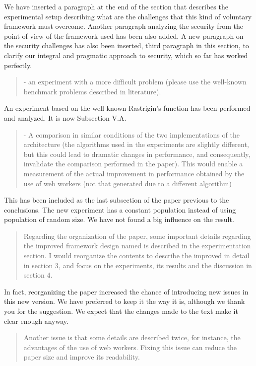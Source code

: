 \documentclass[preprint]{elsarticle}
\begin{document}
We have inserted a paragraph at the end of the section that describes
the experimental setup describing what are the challenges that this
kind of voluntary framework must overcome. Another paragraph analyzing
the security from the point of view of the framework used has been
also added. A new paragraph on the security challenges has also been
inserted, third paragraph in this section, to clarify our integral and
pragmatic approach to security, which so far has worked perfectly. 

\begin{quote}
-  an experiment with a more difficult problem (please use the well-known benchmark problems
described in literature).
\end{quote}

An experiment based on the well known Rastrigin's function has been
performed and analyzed. It is now Subsection V.A.

\begin{quote}
-  A comparison in similar conditions of the two implementations of the architecture (the algorithms
used in the experiments are slightly different, but this could lead to dramatic changes in
performance, and consequently, invalidate the comparison performed in the paper). This would
enable a measurement of the actual improvement in performance obtained by the use of web
workers (not that generated due to a different algorithm)
\end{quote}

This has been included as the last subsection of the paper previous to
the conclusions. The new
experiment has a constant population instead of using  population of random size.
We have not found a big influence on the result. 

\begin{quote}
Regarding the organization of the paper, some important details regarding the improved framework
design named is described in the experimentation section. I would reorganize the contents to describe the
improved in detail in section 3, and focus on the experiments, its
results and the discussion in section 4.
\end{quote}

In fact, reorganizing the paper increased the chance of introducing
new issues in this new version. We have preferred to keep it the way
it is, although we thank you for the suggestion. We expect that the
changes made to the text make it clear enough anyway. 

\begin{quote}
Another issue is that some details are described twice, for instance,
the advantages of the use of web 
workers. Fixing this issue can reduce the paper size and improve its
readability.
\end{quote}
\end{document}
